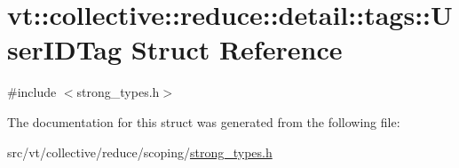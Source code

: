 \hypertarget{structvt_1_1collective_1_1reduce_1_1detail_1_1tags_1_1_user_i_d_tag}{}\section{vt\+:\+:collective\+:\+:reduce\+:\+:detail\+:\+:tags\+:\+:User\+I\+D\+Tag Struct Reference}
\label{structvt_1_1collective_1_1reduce_1_1detail_1_1tags_1_1_user_i_d_tag}


{\ttfamily \#include $<$strong\+\_\+types.\+h$>$}



The documentation for this struct was generated from the following file\+:\begin{DoxyCompactItemize}
\item 
src/vt/collective/reduce/scoping/\hyperlink{strong__types_8h}{strong\+\_\+types.\+h}\end{DoxyCompactItemize}
